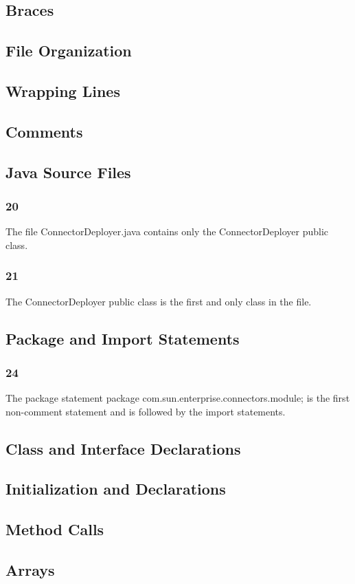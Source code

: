 \documentclass{article}
\begin{document}
\subsection{Braces}
\subsection{File Organization}
\subsection{Wrapping Lines}
\subsection{Comments}
\subsection{Java Source Files}
\subsubsection{20}
The file ConnectorDeployer.java contains only the ConnectorDeployer public class.
\subsubsection{21}
The ConnectorDeployer public class is the first and only class in the file.
\subsection{Package and Import Statements}
\subsubsection{24}
The package statement package com.sun.enterprise.connectors.module; is
the first non-comment statement and is followed by the import statements.
\subsection{Class and Interface Declarations}
\subsection{Initialization and Declarations}
\subsection{Method Calls}
\subsection{Arrays}
\end{document}
